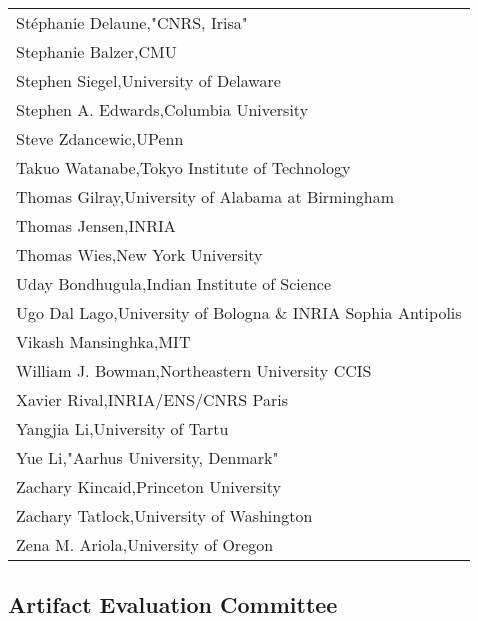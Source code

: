 \begin{tabular}[t]{@{}p{\namewidth}}
Stéphanie Delaune,"CNRS, Irisa"\\
Stephanie Balzer,CMU\\
Stephen  Siegel,University of Delaware\\
Stephen A. Edwards,Columbia University\\
Steve Zdancewic,UPenn\\
Takuo Watanabe,Tokyo Institute of Technology\\
Thomas Gilray,University of Alabama at Birmingham\\
Thomas Jensen,INRIA\\
Thomas Wies,New York University\\
Uday Bondhugula,Indian Institute of Science\\
Ugo Dal Lago,University of Bologna \& INRIA Sophia Antipolis\\
Vikash Mansinghka,MIT\\
William J. Bowman,Northeastern University CCIS\\
Xavier Rival,INRIA/ENS/CNRS Paris\\
Yangjia Li,University of Tartu\\
Yue Li,"Aarhus University, Denmark"\\
Zachary Kincaid,Princeton University\\
Zachary Tatlock,University of Washington\\
Zena M. Ariola,University of Oregon\\
\end{tabular}

\subsection*{\sffamily Artifact Evaluation Committee}

